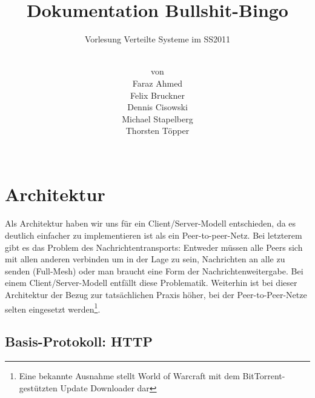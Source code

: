 \documentclass[12pt, a4paper]{scrartcl}
\begin{document}
\pagestyle{fancy}
\newcommand{\np}{\bigskip\noindent}

\setlength{\parindent}{0pt}

\lstset{%
	basicstyle=\small\ttfamily,%
	frame=single,%
}


\author{\\
von\\
Faraz Ahmed\\
Felix Bruckner\\
Dennis Cisowski\\
Michael Stapelberg\\
Thorsten Töpper\\
~}
\title{Dokumentation Bullshit-Bingo}
\subtitle{Vorlesung Verteilte Systeme im SS2011}

\maketitle
\clearpage

\tableofcontents

\clearpage
\section{Architektur}

Als Architektur haben wir uns für ein Client/Server-Modell entschieden, da es
deutlich einfacher zu implementieren ist als ein Peer-to-peer-Netz. Bei
letzterem gibt es das Problem des Nachrichtentransports: Entweder müssen alle
Peers sich mit allen anderen verbinden um in der Lage zu sein, Nachrichten an
alle zu senden (Full-Mesh) oder man braucht eine Form der
Nachrichtenweitergabe. Bei einem Client/Server-Modell entfällt diese
Problematik. Weiterhin ist bei dieser Architektur der Bezug zur tatsächlichen
Praxis höher, bei der Peer-to-Peer-Netze selten eingesetzt werden\footnote{Eine
bekannte Ausnahme stellt World of Warcraft mit dem BitTorrent-gestützten Update
Downloader dar}.

\subsection{Basis-Protokoll: HTTP}
\end{document}
